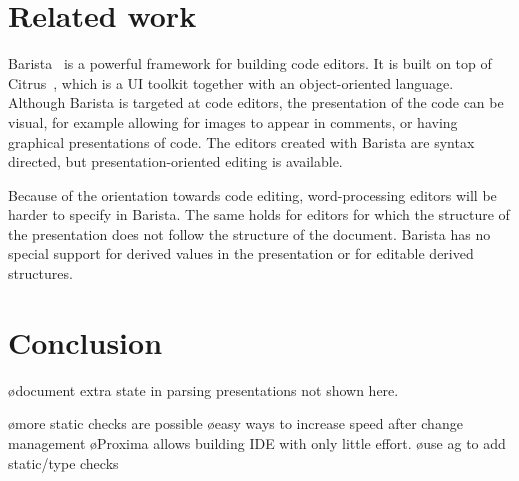 \documentclass[12pt]{article}
\begin{document}
%
\section{Related work}\label{sect:relatedWork}
%

\bc
{}





\noindent Barista~\cite{KoMyers06Barista} is a powerful framework for building code editors. It is built on top of Citrus~\cite{KoMyers05Citrus}, which is a UI toolkit together with an object-oriented language. Although Barista is targeted at code editors, the presentation of the code can be visual, for example allowing for images to appear in comments, or having graphical presentations of code. The editors created with Barista are syntax directed, but presentation-oriented editing is available. 

Because of the orientation towards code editing, word-processing editors will be harder to specify in Barista. The same holds for editors for which the structure of the presentation does not follow the structure of the document. Barista has no special support for derived values in the presentation or for editable derived structures.

\ec



%
\section{Conclusion}\label{sect:conclusion}
%



\bc
\bl
\o document extra state in parsing presentations not shown here.
\el

\bl
\o more static checks are possible
\o easy ways to increase speed after change management
\o Proxima allows building IDE with only little effort.
\o use ag to add static/type checks
\el
\ec


%



\end{document}

